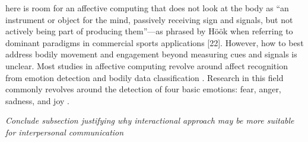 here is room for an affective computing that does not look at the body as “an instrument or object for the mind, passively receiving sign and signals, but not actively being part of producing them”—as phrased by Höök when referring to dominant paradigms in commercial sports applications [22]. However, how to best address bodily movement and engagement beyond measuring cues and signals is unclear. Most studies in affective computing revolve around affect recognition from emotion detection and bodily data classification \cite{bota_review_2019}. Research in this field commonly revolves around the detection of four basic emotions: fear, anger, sadness, and joy \cite{picard_mit_nodate}.

\textit{Conclude subsection justifying why interactional approach may be more suitable for interpersonal communication}

